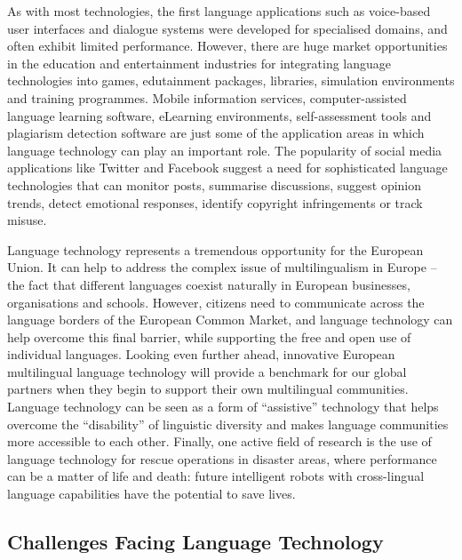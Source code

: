 \documentclass[]{../metanetpaper}
\begin{document}
\begin{multicols}{2}
As with most technologies, the first language applications such as voice-based user interfaces and dialogue systems were developed for specialised domains, and often exhibit limited performance. However, there are huge market opportunities in the education and entertainment industries for integrating language technologies into games, edutainment packages, libraries, simulation environments and training programmes. Mobile information services, computer-assisted language learning software, eLearning environments, self-assessment tools and plagiarism detection software are just some of the application areas in which language technology can play an important role. The popularity of social media applications like Twitter and Facebook suggest a need for sophisticated language technologies that can monitor posts, summarise discussions, suggest opinion trends, detect emotional responses, identify copyright infringements or track misuse.


Language technology represents a tremendous opportunity for the European Union. It can help to address the complex issue of multilingualism in Europe – the fact that different languages coexist naturally in European businesses, organisations and schools. However, citizens need to communicate across the language borders of the European Common Market, and language technology can help overcome this final barrier, while supporting the free and open use of individual languages. Looking even further ahead, innovative European multilingual language technology will provide a benchmark for our global partners when they begin to support their own multilingual communities. Language technology can be seen as a form of “assistive” technology that helps overcome the “disability” of linguistic diversity and makes language communities more accessible to each other. Finally, one active field of research is the use of language technology for rescue operations in disaster areas, where performance can be a matter of life and death: future intelligent robots with cross-lingual language capabilities have the potential to save lives.

\subsection{Challenges Facing Language Technology}


\end{multicols}
\end{document}
